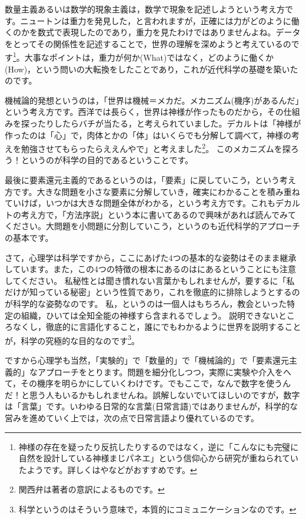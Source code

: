 \documentclass{ltjsbook}
\begin{document}
数量主義あるいは数学的現象主義は，数学で現象を記述しようという考え方です。ニュートンは重力を発見した，と言われますが，正確には力がどのように働くのかを数式で表現したのであり，重力を見たわけではありませんよね。データをとってその関係性を記述することで，世界の理解を深めようと考えているのです\footnote{神様の存在を疑ったり反抗したりするのではなく，逆に「こんなにも完璧に自然を設計している神様まじパネエ」という信仰心から研究が重ねられていたようです。詳しくは\textcite{IkeuchiR2014}や\textcite{Hebizo2016}などがおすすめです。}。大事なポイントは，重力が何か(What)ではなく，どのように働くか(How)，という問いの大転換をしたことであり，これが近代科学の基礎を築いたのです。

機械論的発想というのは，「世界は機械＝メカだ。メカニズム(機序)があるんだ」という考え方です。西洋では長らく，世界は神様が作ったものだから，その仕組みを探ったりしたらバチが当たる，と考えられていました。デカルトは「神様が作ったのは「心」で，肉体とかの「体」はいくらでも分解して調べて，神様の考えを勉強させてもらったらええんやで」と考えました\footnote{関西弁は著者の意訳によるものです。}。
このメカニズムを探ろう！というのが科学の目的であるということです。

最後に要素還元主義的であるというのは，「要素」に戻していこう，という考え方です。大きな問題を小さな要素に分解していき，確実にわかることを積み重ねていけば，いつかは大きな問題全体がわかる，という考え方です。これもデカルトの考え方で，「方法序説」という本に書いてあるので興味があれば読んでみてください\parencite{Descartes}。大問題を小問題に分割していこう，というのも近代科学的アプローチの基本です。

さて，心理学は科学ですから，ここにあげた4つの基本的な姿勢はそのまま継承しています。また，この4つの特徴の根本にあるのはにあるということにも注意してください。
私秘性とは聞き慣れない言葉かもしれませんが，要するに「私だけが知っている秘密」という性質であり，これを徹底的に排除しようとするのが科学的な姿勢なのです。
私，というのは一個人はもちろん，教会といった特定の組織，ひいては全知全能の神様すら含まれるでしょう。
説明できないところなくし，徹底的に言語化すること，誰にでもわかるように世界を説明することが，科学の究極的な目的なのです\footnote{科学というのはそういう意味で，本質的にコミュニケーションなのです。}。

ですから心理学も当然，「実験的」で「数量的」で「機械論的」で「要素還元主義的」なアプローチをとります。問題を細分化しつつ，実際に実験や介入をへて，その機序を明らかにしていくわけです。でもここで，なんで数字を使うんだ！と思う人もいるかもしれませんね。誤解しないでいてほしいのですが，数字は「言葉」です。いわゆる日常的な言葉(日常言語)ではありませんが，科学的な営みを進めていく上では，次の点で日常言語より優れているのです。
\end{document}
